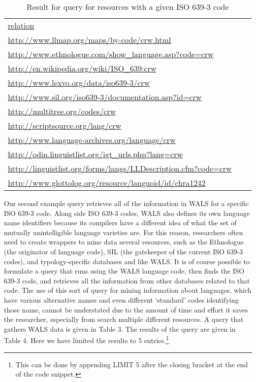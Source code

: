 \begin{table*}
\caption{Result for query for resources with a given ISO 639-3 code} \label{t1}
\begin{tabular}{lll}
\hline
\url{relation} \\
\url{http://www.llmap.org/maps/by-code/crw.html} \\
\url{http://www.ethnologue.com/show_language.asp?code=crw} \\
\url{http://en.wikipedia.org/wiki/ISO_639:crw} \\
\url{http://www.lexvo.org/data/iso639-3/crw} \\
\url{http://www.sil.org/iso639-3/documentation.asp?id=crw} \\
\url{http://multitree.org/codes/crw} \\
\url{http://scriptsource.org/lang/crw} \\
\url{http://www.language-archives.org/language/crw} \\
\url{http://odin.linguistlist.org/igt_urls.php?lang=crw} \\
\url{http://linguistlist.org/forms/langs/LLDescription.cfm?code=crw} \\
\url{http://www.glottolog.org/resource/languoid/id/chra1242} \\
\hline
\end{tabular}
\end{table*}


Our second example query retrieves all of the information in WALS for a specific ISO 639-3 code. Along side ISO 639-3 codes, WALS also defines its own language name identifiers because its compilers have a different idea of what the set of mutually unintelligible language varieties are. For this reason, researchers often need to create wrappers to mine data several resources, such as the Ethnologue (the originator of language code), SIL (the gatekeeper of the current ISO 639-3 codes), and typology-specific databases and like WALS. It is of course possible to formulate a query that runs using the WALS language code, then finds the ISO 639-3 code, and  retrieves all the information from other databases related to that code. The use of this sort of query for mining information about languages, which have various alternative names and even different `standard' codes identifying those name, cannot be understated due to the amount of time and effort it saves the researcher, especially from search multiple different resources. A query that gathers WALS data is given in Table 3. The results of the query are given in Table 4. Here we have limited the results to 5 entries.\footnote{This can be done by appending LIMIT 5 after the closing bracket at the end of the code snippet.}

